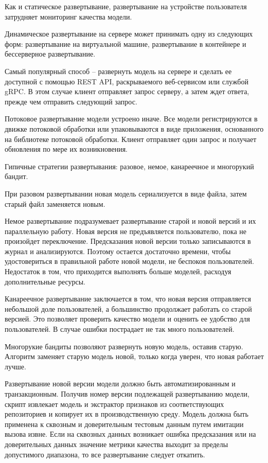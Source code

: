 Как и статическое развертывание, развертывание на устройстве пользователя затрудняет мониторинг качества модели.

Динамическое развертывание на сервере может принимать одну из следующих форм: развертывание на виртуальной машине, развертывание в контейнере и бессерверное развертывание.

Самый популярный способ {--} развернуть модель на сервере и сделать ее доступной с помощью REST API, раскрываемого веб-сервисом или службой gRPC. В этом случае клиент отправляет запрос серверу, а затем ждет ответа, прежде чем отправить следующий запрос.

Потоковое развертывание модели устроено иначе. Все модели регистрируются в движке потоковой обработки или упаковываются в виде приложения, основанного на библиотеке потоковой обработки. Клиент отправляет один запрос и получает обновления по мере их возникновения.

Гипичные стратегии развертывания: разовое, немое, канареечное и многорукий бандит.

При разовом развертывании новая модель сериализуется в виде файла, затем старый файл заменяется новым.

Немое развертывание подразумевает развертывание старой и новой версий и их параллельную работу. Новая версия не предъявляется пользователю, пока не произойдет переключение. Предсказания новой версии только записываются в журнал и анализируются. Поэтому остается достаточно времени, чтобы удостовериться в правильной работе новой модели, не беспокоя пользователей. Недостаток в том, что приходится выполнять больше моделей, расходуя дополнительные ресурсы.

Канареечное развертывание заключается в том, что новая версия отправляется небольшой доле пользователей, а большинство продолжает работать со старой версией. Это позволяет проверить качество модели и оценить ее удобство для пользователей. В случае ошибки пострадает не так много пользователей.

Многорукие бандиты позволяют развернуть новую модель, оставив старую. Алгоритм заменяет старую модель новой, только когда уверен, что новая работает лучше.

Развертывание новой версии модели должно быть автоматизированным и транзакционным. Получив номер версии подлежащей развертыванию модели, скрипт извлекает модель и экстрактор признаков из соответствующих репозиториев и копирует их в производственную среду. Модель должна быть применена к сквозным и доверительным тестовым данным путем имитации вызова извне. Если на сквозных данных возникает ошибка предсказания или на доверительных данных значение метрики качества выходит за пределы допустимого диапазона, то все развертывание следует откатить.


